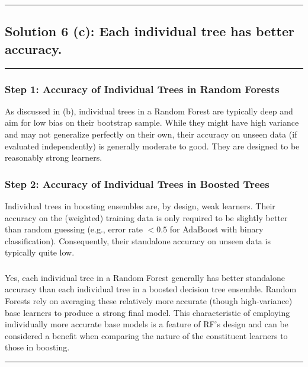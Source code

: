 \documentclass{article}
\begin{document}
\noindent\rule{\textwidth}{0.4pt}

\newpage

\subsection*{Solution 6 (c): Each individual tree has better accuracy.}
\noindent\rule{\textwidth}{0.4pt}

\subsubsection*{Step 1: Accuracy of Individual Trees in Random Forests}
\parbox{\textwidth}{
As discussed in (b), individual trees in a Random Forest are typically deep and aim for low bias on their bootstrap sample. While they might have high variance and may not generalize perfectly on their own, their accuracy on unseen data (if evaluated independently) is generally moderate to good. They are designed to be reasonably strong learners.
}

\subsubsection*{Step 2: Accuracy of Individual Trees in Boosted Trees}
\parbox{\textwidth}{
Individual trees in boosting ensembles are, by design, weak learners. Their accuracy on the (weighted) training data is only required to be slightly better than random guessing (e.g., error rate $<\!0.5$ for AdaBoost with binary classification). Consequently, their standalone accuracy on unseen data is typically quite low.
}

\subsubsection*{}
\parbox{\textwidth}{
Yes, each individual tree in a Random Forest generally has better standalone accuracy than each individual tree in a boosted decision tree ensemble. Random Forests rely on averaging these relatively more accurate (though high-variance) base learners to produce a strong final model. This characteristic of employing individually more accurate base models is a feature of RF's design and can be considered a benefit when comparing the nature of the constituent learners to those in boosting.
}

\noindent\rule{\textwidth}{0.4pt}
\end{document}
